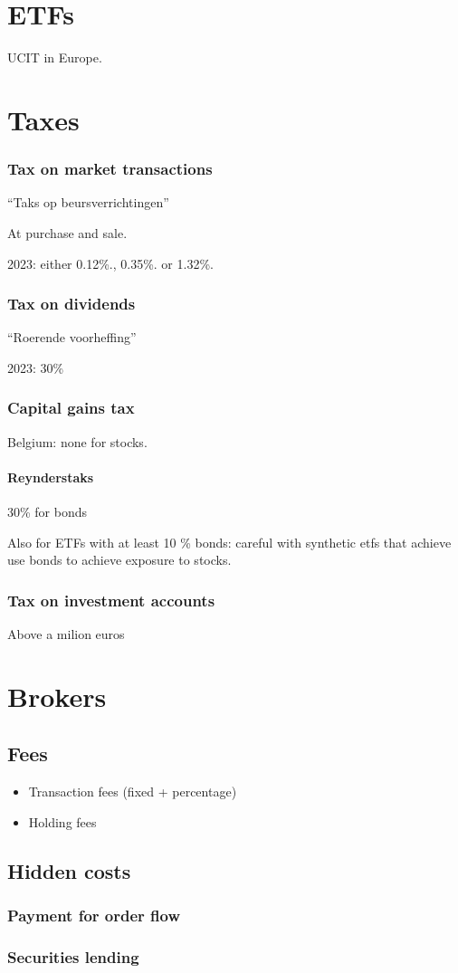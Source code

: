\chapter{ETFs}
UCIT in Europe.

\chapter{Taxes}
\subsection{Tax on market transactions}
``Taks op beursverrichtingen''

At purchase and sale.

2023: either 0.12\%., 0.35\%. or 1.32\%.


\subsection{Tax on dividends}
``Roerende voorheffing''

2023: 30\% 

\subsection{Capital gains tax}
Belgium: none for stocks.

\subsubsection{Reynderstaks}
30\% for bonds

Also for ETFs with at least 10 \% bonds: careful with synthetic etfs that achieve use bonds to achieve exposure to stocks.

\subsection{Tax on investment accounts}
Above a milion euros

\chapter{Brokers}
\section{Fees}
\begin{itemize}
\item Transaction fees (fixed + percentage)
\item Holding fees 
\end{itemize}

\section{Hidden costs}
\subsection{Payment for order flow}


\subsection{Securities lending}

